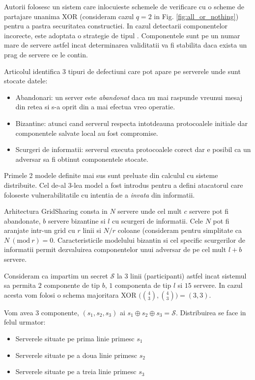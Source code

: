 \documentclass{llncs}
\newcommand{\Mod}[1]{\ (\text{mod}\ #1)}
\newcommand{\todo}[1]{{\color{red}{TODO #1}}}
\begin{document}
Autorii folosesc un sistem care inlocuieste schemele de verificare cu o scheme de partajare unanima XOR (consideram cazul $q = 2$ in Fig. \ref{fig:all_or_nothing}) pentru a pastra securitatea constructiei.
In cazul detectarii componentelor incorecte, este adoptata o strategie de tipul \todo{replicate-and-voting}.
Componentele sunt \todo{replicate} pe un numar mare de servere astfel incat determinarea validitatii va fi stabilita daca exista un prag de servere ce le contin.

Articolul identifica 3 tipuri de defectiuni care pot apare pe serverele unde sunt stocate datele:
\begin{itemize}
	\item Abandonari: un server este \textit{abandonat} daca nu mai raspunde vreunui mesaj din retea si s-a oprit din a mai efectua vreo operatie.
	\item Bizantine: atunci cand serverul respecta intotdeauna protocoalele initiale dar componentele salvate local au fost compromise.
	\item Scurgeri de informatii: serverul executa protocoalele corect dar e posibil ca un adversar sa fi obtinut componentele stocate.
\end{itemize}
Primele 2 modele definite mai sus sunt preluate din calculul cu sisteme distribuite. Cel de-al 3-lea model a fost introdus pentru a defini atacatorul care foloseste vulnerabilitatile cu intentia de a \textit{invata} din informatii.

Arhitectura GridSharing consta in $N$ servere unde cel mult $c$ servere pot fi abandonate, $b$ servere bizantine si $l$ cu scurgeri de informatii. Cele $N$ pot fi aranjate intr-un grid cu $r$ linii si $N/r$ coloane (consideram pentru simplitate ca $N \Mod r = 0$. Caracteristicile modelului bizantin si cel specific scurgerilor de informatii permit dezvaluirea componentelor unui adversar de pe cel mult $l + b$ servere.

\begin{example}
	Consideram ca impartim un secret $\mathcal{S}$ la $3$ linii (participanti) astfel incat sistemul sa permita $2$ componente de tip $b$, $1$ componenta de tip $l$ si $15$ servere. In cazul acesta vom folosi o schema majoritara XOR $\big( {4 \choose 3}, {4 \choose 3}\big) = (3,3)$.

	Vom avea $3$ componente, $(s_1, s_2, s_3)$ ai $s_1 \oplus s_2 \oplus s_3 = \mathcal{S}$.
	Distribuirea se face in felul urmator:
	\begin{itemize}
		\item Serverele situate pe prima linie primesc $s_1$
		\item Serverele situate pe a doua linie primesc $s_2$
		\item Serverele situate pe a treia linie primesc $s_3$
	\end{itemize}
\end{example}
\end{document}
